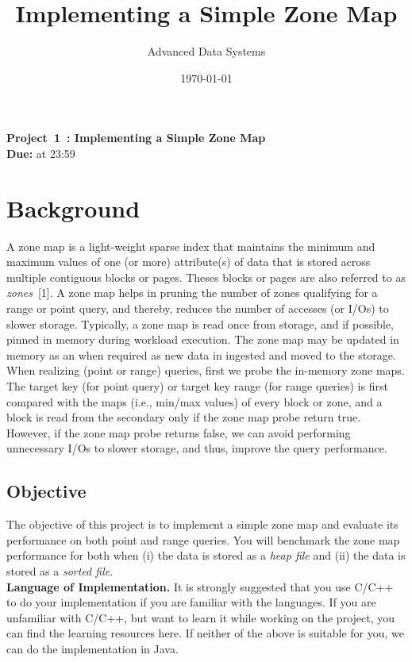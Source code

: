 \documentclass[12pt,a4paper,twoside]{article}
\title{Implementing a Simple Zone Map}
\author{Advanced Data Systems}
\date{\today}
\newcommand{\assignmenttype}{Project}       %
\newcommand{\assignmentnumber}{1}           %
\newcommand{\smallspace}{0.2cm}
\begin{document}
\begin{center}
    \textbf{\assignmenttype\ \assignmentnumber\ \:: Implementing a Simple Zone Map}\\
    \vspace{\smallspace}
    \textbf{Due:}  at 23:59
\end{center}



\section*{Background}
A zone map is a light-weight sparse index that maintains the minimum and maximum values of one (or more) attribute(s) of data that is stored across multiple contiguous blocks or pages.
Theses blocks or pages are also referred to as \textit{zones}~[1]. 
A zone map helps in pruning the number of zones qualifying for a range or point query, and thereby, reduces the number of accesses (or I/Os) to slower storage. 
Typically, a zone map is read once from storage, and if possible, pinned in memory during workload execution. 
The zone map may be updated in memory as an when required as new data in ingested and moved to the storage. 
When realizing (point or range) queries, first we probe the in-memory zone maps. 
The target key (for point query) or target key range (for range queries) is first compared with the maps (i.e., min/max values) of every block or zone, and a block is read from the secondary only if the zone map probe return true. 
However, if the zone map probe returns false, we can avoid performing unnecessary I/Os to slower storage, and thus, improve the query performance. 

\subsection*{Objective}
The objective of this project is to implement a simple zone map and evaluate its performance on both point and range queries. 
You will benchmark the zone map performance for both when (i) the data is stored as a \textit{heap file} and (ii) the data is stored as a \textit{sorted file}. \\

\noindent \textbf{Language of Implementation.} It is strongly suggested that you use C/C++ to do your implementation if you are familiar with the languages. 
If you are unfamiliar with C/C++, but want to learn it while working on the project, you can find the learning resources here. 
If neither of the above is suitable for you, we can do the implementation in Java. \\
\end{document}
